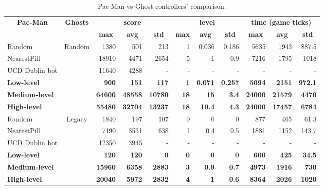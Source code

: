 \begin{table}[]
\centering
\label{table:single_obj}
\begin{tabular}{|l|c|r|r|r|r|r|r|r|r|r|}
\hline
\multicolumn{1}{|c|}{\multirow{2}{*}{\textbf{Pac-Man}}} & \multirow{2}{*}{\textbf{Ghosts}} & \multicolumn{3}{c|}{\textbf{score}} & \multicolumn{3}{c|}{\textbf{level}} & \multicolumn{3}{c|}{\textbf{time (game ticks)}} \\ \cline{3-11} 
\multicolumn{1}{|c|}{} &  & \multicolumn{1}{c|}{\textbf{max}} & \multicolumn{1}{c|}{\textbf{avg}} & \multicolumn{1}{c|}{\textbf{std}} & \multicolumn{1}{c|}{\textbf{max}} & \multicolumn{1}{c|}{\textbf{avg}} & \multicolumn{1}{c|}{\textbf{std}} & \multicolumn{1}{c|}{\textbf{max}} & \multicolumn{1}{c|}{\textbf{avg}} & \multicolumn{1}{c|}{\textbf{std}} \\ \hline
Random &  \multirow{5}{*}{Random} & 1380 & 501 & 213 & 1 & 0.036 & 0.186 & 5635 & 1943 & 887.5 \\ \cline{1-1} \cline{3-11} 
NearestPill &  & 18910 & 4471 & 2654 & 5 & 1 & 0.9 & 7216 & 1795 & 1018 \\ \cline{1-1} \cline{3-11} 
UCD Dublin bot \cite{galvan2010evolving} &  & 11640 & 4288 & - & - & - & - & - & - & - \\ \cline{1-1} \cline{3-11} 
\textbf{Low-level} &  & \textbf{900} & \textbf{151} & \textbf{117} & \textbf{1} & \textbf{0.071} & \textbf{0.257} & \textbf{5094} & \textbf{2151} & \textbf{972.1} \\ \cline{1-1} \cline{3-11} 
\textbf{Medium-level} &  & \textbf{64600} & \textbf{48558} & \textbf{10780} & \textbf{18} & \textbf{15} & \textbf{3.4} & \textbf{24000} & \textbf{21579} & \textbf{4470} \\ \cline{1-1} \cline{3-11} 
\textbf{High-level} &  & \textbf{55480} & \textbf{32704} & \textbf{13237} & \textbf{18} & \textbf{10.4} & \textbf{4.3} & \textbf{24000} & \textbf{17457} & \textbf{6784} \\ \hline
Random & \multirow{5}{*}{Legacy} & 1840 & 197 & 107 & 0 & 0 & 0 & 877 & 465 & 61.3 \\ \cline{1-1} \cline{3-11} 
NearestPill &  & 7190 & 3531 & 638 & 1 & 0.4 & 0.5 & 1881 & 1152 & 143.7 \\ \cline{1-1} \cline{3-11} 
UCD Dublin bot \cite{galvan2010evolving} &  & 12350 & 3945 & - & - & - & - & - & - & - \\ \cline{1-1} \cline{3-11} 
\textbf{Low-level} &  & \textbf{120} & \textbf{120} & \textbf{0} & \textbf{0} & \textbf{0} & \textbf{0} & \textbf{600} & \textbf{425} & \textbf{34.5} \\ \cline{1-1} \cline{3-11} 
\textbf{Medium-level} &  & \textbf{15960} & \textbf{6358} & \textbf{2883} & \textbf{3} & \textbf{0.9} & \textbf{0.7} & \textbf{4973} & \textbf{1916} & \textbf{730} \\ \cline{1-1} \cline{3-11} 
\textbf{High-level} &  & \textbf{20040} & \textbf{5972} & \textbf{2832} & \textbf{4} & \textbf{1} & \textbf{0.6} & \textbf{8364} & \textbf{2026} & \textbf{1020} \\ \hline
\end{tabular}
\caption{Pac-Man vs Ghost controllers' comparison.}
\end{table}

